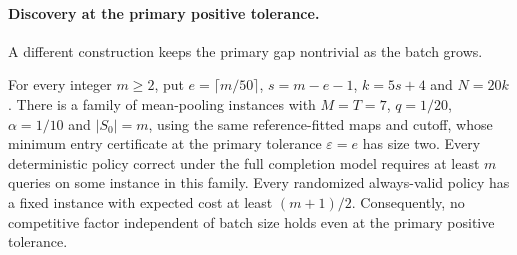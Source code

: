 \paragraph{Discovery at the primary positive tolerance.}
A different construction keeps the primary gap nontrivial as the batch grows.
\begin{proposition}
\label{prop:positive-discovery}
For every integer $m\ge2$, put $e=\lceil m/50\rceil$, $s=m-e-1$, $k=5s+4$ and $N=20k$. There is a family of mean-pooling instances with $M=T=7$, $q=1/20$, $\alpha=1/10$ and $|S_0|=m$, using the same reference-fitted maps and cutoff, whose minimum entry certificate at the primary tolerance $\varepsilon=e$ has size two. Every deterministic policy correct under the full completion model requires at least $m$ queries on some instance in this family. Every randomized always-valid policy has a fixed instance with expected cost at least $(m+1)/2$. Consequently, no competitive factor independent of batch size holds even at the primary positive tolerance.
\end{proposition}
